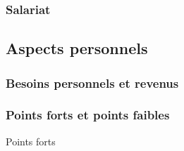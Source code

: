 \documentclass{article}
\begin{document}
\subsubsection*{Salariat}

\subsection{Aspects personnels}

\subsubsection*{Besoins personnels et revenus}

\subsubsection*{Points forts et points faibles}

Points forts 
\end{document}
